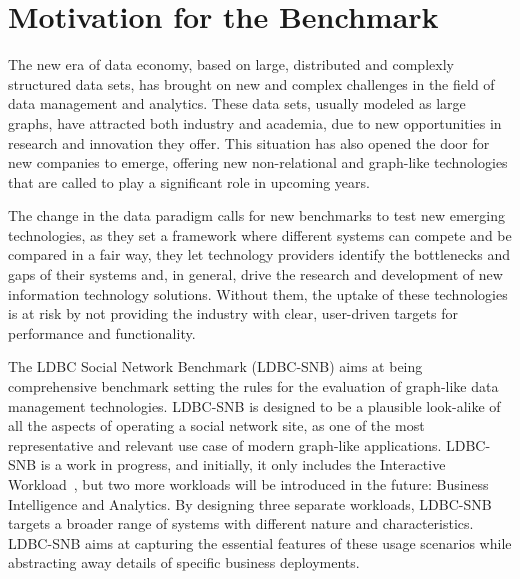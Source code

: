 

\section{Motivation for the Benchmark}

The new era of data economy, based on large, distributed and complexly
structured data sets, has brought on new and complex challenges in the field of
data management and analytics. These data sets, usually modeled as large
graphs, have attracted both industry and academia, due to new
opportunities in research and innovation they offer.  This situation has also
opened the door for new companies to emerge, offering new non-relational and
graph-like technologies that are called to play a significant role in upcoming
years.

The change in the data paradigm calls for new benchmarks to test new
emerging technologies, as they set a framework where different systems can
compete and be compared in a fair way, they let technology providers identify
the bottlenecks and gaps of their systems and, in general, drive the research
and development of new information technology solutions. Without them, the
uptake of these technologies is at risk by not providing the industry with
clear, user-driven targets for performance and functionality.

The LDBC Social Network Benchmark (LDBC-SNB) aims at being comprehensive
benchmark setting the rules for the evaluation of graph-like data management
technologies.  LDBC-SNB is designed to be a plausible look-alike of all the
aspects of operating a social network site, as one of the most representative
and relevant use case of modern graph-like applications. LDBC-SNB is a work in
progress, and initially, it only includes the Interactive Workload~\cite{DBLP:conf/sigmod/ErlingALCGPPB15},
but two more workloads will be introduced in the future: Business
Intelligence and Analytics.  By designing three separate workloads, LDBC-SNB
targets a broader range of systems with different nature and characteristics.
LDBC-SNB aims at capturing the essential features of these usage scenarios
while abstracting away details of specific business deployments.

